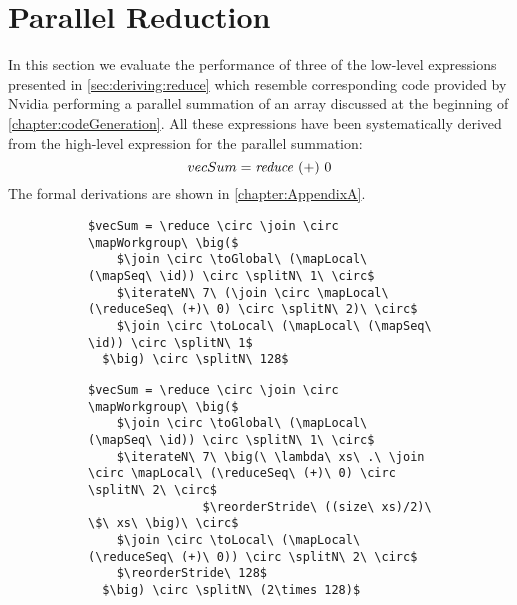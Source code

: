 \section{Parallel Reduction}
In this section we evaluate the performance of three of the low-level expressions presented in \autoref{sec:deriving:reduce} which resemble corresponding \OpenCL code provided by Nvidia performing a parallel summation of an array discussed at the beginning of \autoref{chapter:codeGeneration}.
All these expressions have been systematically derived from the high-level expression for the parallel summation:
\begin{equation*}
  vecSum = \text{\textit{reduce}}\ (+)\ 0
\end{equation*}
The formal derivations are shown in \autoref{chapter:AppendixA}.

\begin{figure*}[t]
\captionsetup[subfigure]{justification=justified,singlelinecheck=false}

\begin{subfigure}[b]{\linewidth}
\vspace{.4em}
\begin{minipage}{.05\linewidth}
\caption{}
\label{fig:reduce:expr:1}
\end{minipage}
\hfill
\begin{minipage}{.9\linewidth}
\begin{lstlisting}[mathescape, basicstyle=\small\rmfamily]
$vecSum = \reduce \circ \join \circ \mapWorkgroup\ \big($
    $\join \circ \toGlobal\ (\mapLocal\ (\mapSeq\ \id)) \circ \splitN\ 1\ \circ$
    $\iterateN\ 7\ (\join \circ \mapLocal\ (\reduceSeq\ (+)\ 0) \circ \splitN\ 2)\ \circ$
    $\join \circ \toLocal\ (\mapLocal\ (\mapSeq\ \id)) \circ \splitN\ 1$
  $\big) \circ \splitN\ 128$
\end{lstlisting}
\end{minipage}
\end{subfigure}

\begin{subfigure}[b]{\linewidth}
\vspace{0em}
\begin{minipage}{.05\linewidth}
\caption{}
\label{fig:reduce:expr:2}
\end{minipage}
\hfill
\begin{minipage}{.9\linewidth}
\begin{lstlisting}[mathescape, basicstyle=\small\rmfamily]
$vecSum = \reduce \circ \join \circ \mapWorkgroup\ \big($
    $\join \circ \toGlobal\ (\mapLocal\ (\mapSeq\ \id)) \circ \splitN\ 1\ \circ$
    $\iterateN\ 7\ \big(\ \lambda\ xs\ .\ \join \circ \mapLocal\ (\reduceSeq\ (+)\ 0) \circ \splitN\ 2\ \circ$
                $\reorderStride\ ((size\ xs)/2)\ \$\ xs\ \big)\ \circ$
    $\join \circ \toLocal\ (\mapLocal\ (\reduceSeq\ (+)\ 0)) \circ \splitN\ 2\ \circ$
    $\reorderStride\ 128$
  $\big) \circ \splitN\ (2\times 128)$
\end{lstlisting}
\end{minipage}
\end{subfigure}


\end{figure*}
